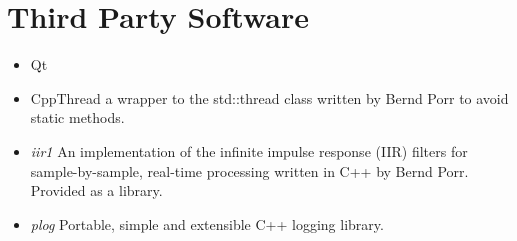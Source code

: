 \section{Third Party Software}

\begin{itemize}
\item Qt %
\item CppThread a wrapper to the std::thread class written by Bernd Porr to avoid static methods. %
\item \emph{iir1} An implementation of the infinite impulse response (IIR) filters for sample-by-sample, real-time processing written in C++ by Bernd Porr. Provided as a library.%
\item \emph{plog} Portable, simple and extensible C++ logging library. %
\end{itemize}

